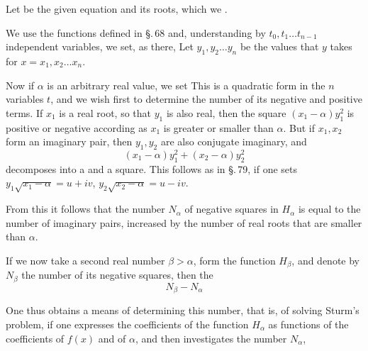 Let
be the given equation and
its roots, which we .

We use the functions defined in \S.\,68
and, understanding by $t_0, t_1 \ldots t_{n-1}$ independent variables, we set, as there,
Let $y_1, y_2 \ldots y_n$ be the values that $y$ takes for $x = x_1, x_2 \ldots x_n$.

Now if $\alpha$ is an arbitrary real value, we set
This is a quadratic form in the $n$ variables $t$, and we wish first to determine the number of its negative and positive terms. If $x_1$ is a real root, so that $y_1$ is also real, then the square $(x_1-\alpha)y_1^2$ is positive or negative according as $x_1$ is greater or smaller than $\alpha$. But if $x_1, x_2$ form an imaginary pair, then $y_1, y_2$ are also conjugate imaginary, and
\[ (x_1-\alpha)y_1^2 + (x_2-\alpha)y_2^2 \]
decomposes into a  and a  square. This follows as in \S.\,79, if one sets $y_1\sqrt{x_1-\alpha} = u+iv$, $y_2\sqrt{x_2-\alpha} = u-iv$.

From this it follows that the number $N_\alpha$ of negative squares in $H_\alpha$ is equal to the number of imaginary pairs, increased by the number of real roots that are smaller than $\alpha$.

If we now take a second real number $\beta > \alpha$, form the function $H_\beta$, and denote by $N_\beta$ the number of its negative squares, then the 
\[ N_\beta - N_\alpha \]

One thus obtains a means of determining this number, that is, of solving Sturm's problem, if one expresses the coefficients of the function $H_\alpha$ as functions of the coefficients of $f(x)$ and of $\alpha$, and then investigates the number $N_\alpha$,
